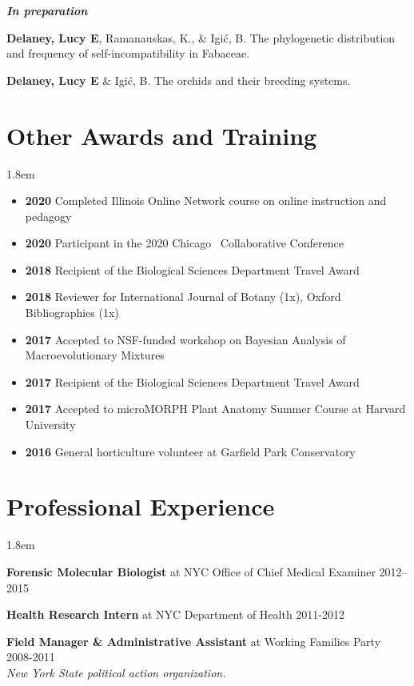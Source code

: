 \documentclass[]{article}
\newlength{\cslhangindent}
\newenvironment{cslreferences}
{\setlength{\parindent}{0pt}
\everypar{\setlength{\hangindent}{\cslhangindent}}\ignorespaces}
{\par}
\begin{document}
\textbf{\textit{In preparation}}
\vspace{2mm}

\begin{cslreferences}
\textbf{Delaney, Lucy E}, Ramanauskas, K., \& Igić, B. The phylogenetic distribution and frequency of self-incompatibility in Fabaceae.

\textbf{Delaney, Lucy E} \& Igić, B. The orchids and their breeding systems.\\
\end{cslreferences}
\vspace{2mm}

\section{Other Awards and Training}

\vspace{2mm}
\leftskip 1.8em

\begin{itemize}[label=$\mathwitch*$]
\item{\textbf{2020} Completed Illinois Online Network course on online instruction and pedagogy}
\item{\textbf{2020} Participant in the 2020 Chicago \textcolor{light-gray}{\faRProject}\ Collaborative Conference \href{https://chircollab.github.io/}{\faLink}}
\item{\textbf{2018} Recipient of the Biological Sciences Department Travel Award}
\item{\textbf{2018} Reviewer for International Journal of Botany (1x), Oxford Bibliographies (1x)}
\item{\textbf{2017} Accepted to NSF-funded workshop on Bayesian Analysis of Macroevolutionary Mixtures \href{http://bamm-project.org/index.html}{\faLink}}
\item{\textbf{2017} Recipient of the Biological Sciences Department Travel Award}
\item{\textbf{2017} Accepted to microMORPH Plant Anatomy Summer Course at Harvard University \href{https://web.archive.org/web/20170922060558/http://arboretum.harvard.edu/tracing-evolution-form-function/"}{\faLink}}
\item{\textbf{2016} General horticulture volunteer at Garfield Park Conservatory \href{https://garfieldconservatory.org/}{\faLink}}
\end{itemize}

\vspace{2mm}
\section{Professional Experience}

\vspace{2mm}
\leftskip 1.8em

\textbf{Forensic Molecular Biologist} at NYC Office of Chief Medical Examiner \hfill 2012--2015
   
\textbf{Health Research Intern} at NYC Department of Health \hfill 2011-2012
     
\textbf{Field Manager \& Administrative Assistant} at Working Families Party \hfill 2008-2011\\
\textit{New York State political action organization.}
\end{document}
